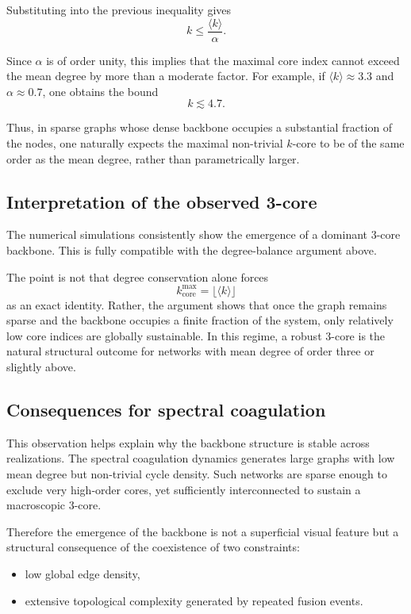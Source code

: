 \documentclass[11pt]{article}
\begin{document}
Substituting into the previous inequality gives
\[
k \le \frac{\langle k\rangle}{\alpha}.
\]

Since $\alpha$ is of order unity, this implies that the maximal core index cannot exceed the mean degree by more than a moderate factor.
For example, if $\langle k\rangle \approx 3.3$ and $\alpha \approx 0.7$, one obtains the bound
\[
k \lesssim 4.7.
\]

Thus, in sparse graphs whose dense backbone occupies a substantial fraction of the nodes, one naturally expects the maximal non-trivial $k$-core to be of the same order as the mean degree, rather than parametrically larger.

\subsection{Interpretation of the observed 3-core}

The numerical simulations consistently show the emergence of a dominant $3$-core backbone.
This is fully compatible with the degree-balance argument above.

The point is not that degree conservation alone forces
\[
k_{\mathrm{core}}^{\max} = \lfloor \langle k\rangle \rfloor
\]
as an exact identity.
Rather, the argument shows that once the graph remains sparse and the backbone occupies a finite fraction of the system, only relatively low core indices are globally sustainable.
In this regime, a robust $3$-core is the natural structural outcome for networks with mean degree of order three or slightly above.

\subsection{Consequences for spectral coagulation}

This observation helps explain why the backbone structure is stable across realizations.
The spectral coagulation dynamics generates large graphs with low mean degree but non-trivial cycle density.
Such networks are sparse enough to exclude very high-order cores, yet sufficiently interconnected to sustain a macroscopic $3$-core.

Therefore the emergence of the backbone is not a superficial visual feature but a structural consequence of the coexistence of two constraints:

\begin{itemize}
\item low global edge density,
\item extensive topological complexity generated by repeated fusion events.
\end{itemize}
\end{document}
